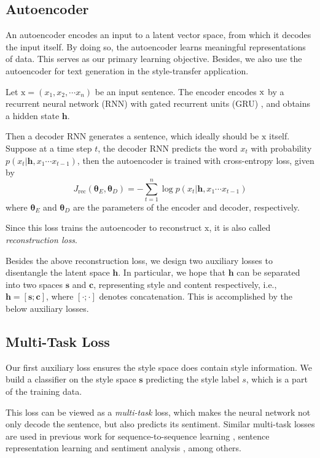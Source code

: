 \documentclass[11pt,a4paper]{article}
\newcommand{\rmx}{\mathrm x}
\begin{document}
\subsection{Autoencoder} \label{ss:seq2seq}

An autoencoder encodes an input to a latent vector space, from which it decodes the input itself. By doing so, the autoencoder learns meaningful representations of data. This serves as our primary learning objective. Besides, we also use the autoencoder for text generation in the style-transfer application.

Let $\rmx=(x_1, x_2, \cdots x_n)$ be an input sentence. The encoder encodes $\rm x$ by a recurrent neural network (RNN) with gated recurrent units (GRU) \cite{cho2014learning}, and obtains a hidden state $\bm h$.

Then a decoder RNN generates a sentence, which ideally should be $\rmx$ itself. Suppose at a time step $t$, the decoder RNN predicts the word $x_t$ with probability $p(x_t|\bm h, x_1\cdots x_{t-1})$, then the autoencoder is trained with cross-entropy loss, given by
\begin{equation}\nonumber
	J_\text{rec}(\bm\theta_E,\bm\theta_D)= -\sum_{t=1}^n \log
	p(x_t|\bm h, x_1\cdots x_{t-1})
\end{equation}
where $\bm\theta_E$ and $\bm\theta_D$ are the parameters of the encoder and decoder, respectively.

Since this loss trains the autoencoder to reconstruct $\rmx$, it is also called \textit{reconstruction loss}.

Besides the above reconstruction loss, we design two auxiliary losses to disentangle the latent space $\bm h$. In particular, we hope that $\bm h$ can be separated into two spaces $\bm s$ and $\bm c$, representing style and content respectively, i.e., $\bm h = [\bm s ; \bm c]$, where $[\cdot;\cdot]$ denotes concatenation. This is accomplished by the below auxiliary losses.

\subsection{Multi-Task Loss} \label{ss:multi}

Our first auxiliary loss ensures the style space does contain style information. We build a classifier on the style space $\bm s$ predicting the style label $s$, which is a part of the training data.

This loss can be viewed as a \textit{multi-task} loss, which makes the neural network not only decode the sentence, but also predicts its sentiment. Similar multi-task losses are used in previous work for sequence-to-sequence learning \cite{luong2015multi}, sentence representation learning \cite{jernite2017discourse} and sentiment analysis \cite{balikas2017multitask}, among others.
\end{document}
